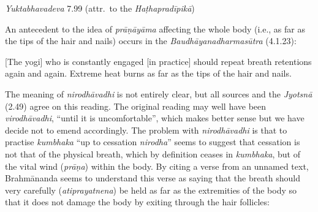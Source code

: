 \begin{ekdosis}
\begin{testimonia}[hp02_049]
\emph{Yuktabhavadeva} 7.99 (attr.~to the \emph{Haṭhapradīpikā})

\begin{versinnote}
\end{versinnote}
\end{testimonia}

\begin{philcomm}[hp02_049]


An antecedent to the idea of \emph{prāṇāyāma} affecting the whole body (i.e., as far as the tips of the hair and nails) occurs in the \emph{Baudhāyanadharmasūtra} (4.1.23):

\begin{versinnote}
{}[The yogi] who is constantly engaged [in practice] should repeat breath retentions again and again. Extreme heat burns as far as the tips of the hair and nails. 
\end{versinnote}

\begin{versinnote}
\end{versinnote}

The meaning of \emph{nirodhāvadhi} is not entirely clear, but all sources and the \emph{Jyotsnā} (2.49) agree on this reading. The original reading may well have been \emph{virodhāvadhi}, “until it is uncomfortable”, which makes better sense but we have decide not to emend accordingly. The problem with \emph{nirodhāvadhi} is that to practise \emph{kumbhaka} ``up to cessation \emph{nirodha}'' seems to suggest that cessation is not that of the physical breath, which by definition ceases in \emph{kumbhaka}, but of the vital wind (\emph{prāṇa}) within the body. By citing a verse from an unnamed text, Brahmānanda seems to understand this verse as saying that the breath should very carefully (\emph{atiprayatnena}) be held as far as the extremities of the body so that it does not damage the body by exiting through the hair follicles:



\end{philcomm}
\end{ekdosis}
